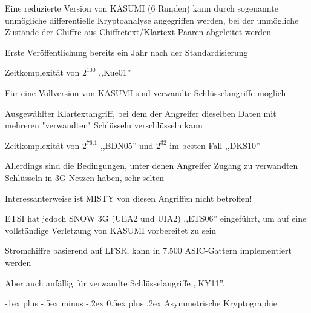 \documentclass[a4paper]{article}
\makeatletter
\renewcommand{\section}{\@startsection{section}{1}{0mm}%
 {-1ex plus -.5ex minus -.2ex}%
 {0.5ex plus .2ex}%
 {\normalfont\large\bfseries}}
\makeatother
\begin{document}
\begin{multicols}{3}
      \begin{itemize*}
            \item Eine reduzierte Version von KASUMI (6 Runden) kann durch sogenannte
            unmögliche differentielle Kryptoanalyse angegriffen werden, bei der
            unmögliche Zustände der Chiffre aus Chiffretext/Klartext-Paaren
            abgeleitet werden
            \begin{itemize*}
                  \item Erste Veröffentlichung bereits ein Jahr nach der Standardisierung
                  \item Zeitkomplexität von $2^{100}$ ,,Kue01''
            \end{itemize*}
            \item Für eine Vollversion von KASUMI sind verwandte Schlüsselangriffe
            möglich
            \begin{itemize*}
                  \item Ausgewählter Klartextangriff, bei dem der Angreifer dieselben Daten mit mehreren "verwandten" Schlüsseln verschlüsseln kann
                  \item Zeitkomplexität von $2^{76.1}$ ,,BDN05'' und $2^{32}$ im besten Fall ,,DKS10''
                  \item Allerdings sind die Bedingungen, unter denen Angreifer Zugang zu verwandten Schlüsseln in 3G-Netzen haben, sehr selten
                  \item Interessanterweise ist MISTY von diesen Angriffen nicht betroffen!
            \end{itemize*}
            \item ETSI hat jedoch SNOW 3G (UEA2 und UIA2) ,,ETS06'' eingeführt, um auf
            eine vollständige Verletzung von KASUMI vorbereitet zu sein
            \begin{itemize*}
                  \item Stromchiffre basierend auf LFSR, kann in 7.500 ASIC-Gattern implementiert werden
                  \item Aber auch anfällig für verwandte Schlüsselangriffe ,,KY11''.
            \end{itemize*}
      \end{itemize*}


      \section{Asymmetrische
        Kryptographie}


\end{multicols}
\end{document}
